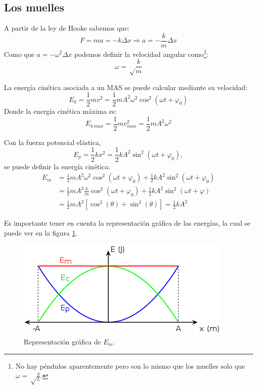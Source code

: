 \documentclass[arial,a4paper,print]{article}
\begin{document}
\subsection{Los muelles}
A partir de la ley de Hooke sabemos que:
\begin{equation*}
	F = ma = -k\Delta x \Rightarrow a = -\frac k m \Delta x
\end{equation*}
Como que $a = -\omega^{2}\Delta x$ podemos definir la velocidad angular como\footnote{No hay péndulos aparentemente pero son lo mismo que los muelles solo que $\omega = \sqrt\frac gL$. }:
\begin{equation*}
	\omega = \sqrt\frac km 
\end{equation*}

La energía cinética asociada a un MAS se puede calcular mediante su velocidad:
\begin{equation*}
	E_{k} = \frac12 mv^{2} = \frac12 m A^{2}\omega^{2}\cos^{2}(\omega t + \varphi_0)
\end{equation*}
Donde la energía cinética máxima es:
\begin{equation*}
	E_{k\,max} = \frac12 mv^{2}_{max} = \frac12 mA^{2}\omega^2
\end{equation*}

Con la fuerza potencial elástica, 
\begin{equation*}
	E_{p} = \frac12 kx^{2} = \frac12 kA^{2}\sin^{2}(\omega t + \varphi_0), 
\end{equation*}  
se puede definir la energía cinética:
\begin{align*}
	E_{m} &= \frac12 mA^{2}\omega^{2}\cos^2(\omega t + \varphi_0) + \frac12 kA^{2}\sin^{2}(\omega t + \varphi_0)\\
	&= \frac12 mA^{2}\frac km \cos^{2}(\omega t + \varphi_0) + \frac12 kA^{2}\sin^2(\omega t + \varphi) \\
	&= \frac12 mA^{2}\left[\cos^2(\theta) + \sin^{2}(\theta)\right] = \frac12 kA^{2}
\end{align*}

Es importante tener en cuenta la representación gráfica de las energías, la cual se puede ver en la figura \ref{fig:energiamas}.
\begin{figure}[h]
	\centering
	\includegraphics[width=0.5\linewidth]{Energia_MAS}
	\caption{Representación gráfica de $E_{m}$.}
	\label{fig:energiamas}
\end{figure}
\end{document}

